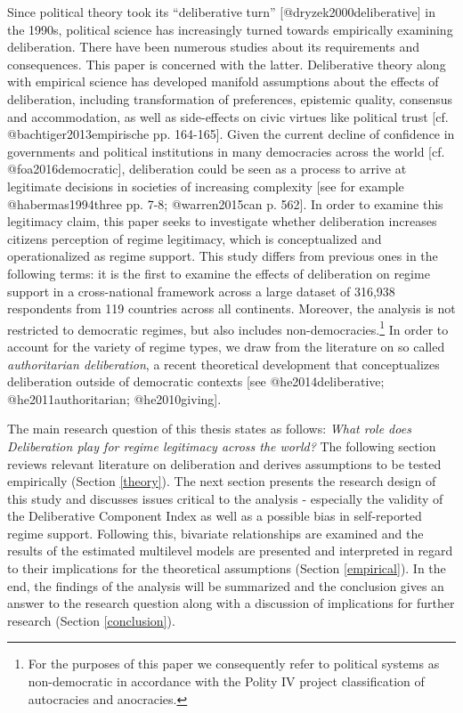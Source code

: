 \documentclass[]{article}
\title{}
\author{}
\date{}
\let\rmarkdownfootnote\footnote%
\def\footnote{\protect\rmarkdownfootnote}
\begin{document}
Since political theory took its ``deliberative turn''
{[}@dryzek2000deliberative{]} in the 1990s, political science has
increasingly turned towards empirically examining deliberation. There
have been numerous studies about its requirements and consequences. This
paper is concerned with the latter. Deliberative theory along with
empirical science has developed manifold assumptions about the effects
of deliberation, including transformation of preferences, epistemic
quality, consensus and accommodation, as well as side-effects on civic
virtues like political trust {[}cf. @bachtiger2013empirische pp.
164-165{]}. Given the current decline of confidence in governments and
political institutions in many democracies across the world {[}cf.
@foa2016democratic{]}, deliberation could be seen as a process to arrive
at legitimate decisions in societies of increasing complexity {[}see for
example @habermas1994three pp. 7-8; @warren2015can p. 562{]}. In order
to examine this legitimacy claim, this paper seeks to investigate
whether deliberation increases citizens perception of regime legitimacy,
which is conceptualized and operationalized as regime support. This
study differs from previous ones in the following terms: it is the first
to examine the effects of deliberation on regime support in a
cross-national framework across a large dataset of 316,938 respondents
from 119 countries across all continents. Moreover, the analysis is not
restricted to democratic regimes, but also includes
non-democracies.\footnote{For the purposes of this paper we consequently
  refer to political systems as non-democratic in accordance with the
  Polity IV project classification of autocracies and anocracies.} In
order to account for the variety of regime types, we draw from the
literature on so called \textit{authoritarian deliberation}, a recent
theoretical development that conceptualizes deliberation outside of
democratic contexts {[}see @he2014deliberative; @he2011authoritarian;
@he2010giving{]}.

The main research question of this thesis states as follows:
\textit{What role does Deliberation play for regime legitimacy across the world?}
The following section reviews relevant literature on deliberation and
derives assumptions to be tested empirically (Section \ref{theory}). The
next section presents the research design of this study and discusses
issues critical to the analysis - especially the validity of the
Deliberative Component Index as well as a possible bias in self-reported
regime support. Following this, bivariate relationships are examined and
the results of the estimated multilevel models are presented and
interpreted in regard to their implications for the theoretical
assumptions (Section \ref{empirical}). In the end, the findings of the
analysis will be summarized and the conclusion gives an answer to the
research question along with a discussion of implications for further
research (Section \ref{conclusion}).
\end{document}

